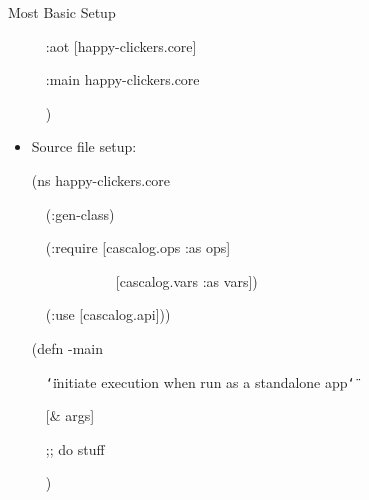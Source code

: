 \documentclass{beamer}
\renewcommand{\textquotedbl}{\texttt{\char`\"}}
\begin{document}
\begin{frame}[allowframebreaks]{Most Basic Setup}
\begin{itemize}
\begin{small}
{\ttfamily\color{black}
\ \ \textcolor[rgb]{0.28235295,0.23921569,0.54509807}{:aot}
[happy-clickers.core]}

{\ttfamily\color{black}
\ \ \textcolor[rgb]{0.28235295,0.23921569,0.54509807}{:main}
happy-clickers.core}

{\ttfamily\color{black}
\ \ )}
\end{small}

\framebreak

  \item Source file setup:\\

\begin{small}
{\ttfamily\color{black}
%
(ns happy-clickers.core}

{\ttfamily\color{black}
\ \ (\textcolor[rgb]{0.28235295,0.23921569,0.54509807}{:gen-class})}

{\ttfamily\color{black}
\ \ (\textcolor[rgb]{0.28235295,0.23921569,0.54509807}{:require}
[cascalog.ops \textcolor[rgb]{0.28235295,0.23921569,0.54509807}{:as}
ops]}

{\ttfamily\color{black}
\ \ \ \ \ \ \ \ \ \ \ \ [cascalog.vars
\textcolor[rgb]{0.28235295,0.23921569,0.54509807}{:as} vars])}

{\ttfamily\color{black}
\ \ (\textcolor[rgb]{0.28235295,0.23921569,0.54509807}{:use}
[cascalog.api]))}


\bigskip


\bigskip

{\ttfamily\color{black}
(defn -main}

{\ttfamily\color{black}
\ \ \textcolor[rgb]{0.54509807,0.13333334,0.32156864}{{\textquotedbl}initiate
execution when run as a standalone app{\textquotedbl}}}

{\ttfamily\color{black}
\ \ [\& args]}

{\ttfamily\color{black}
\ \ \textcolor[rgb]{0.69803923,0.13333334,0.13333334}{;; do stuff}}

{\ttfamily\color{black}
\ \ )}
\end{small}

  \end{itemize}
\end{frame}
\end{document}
